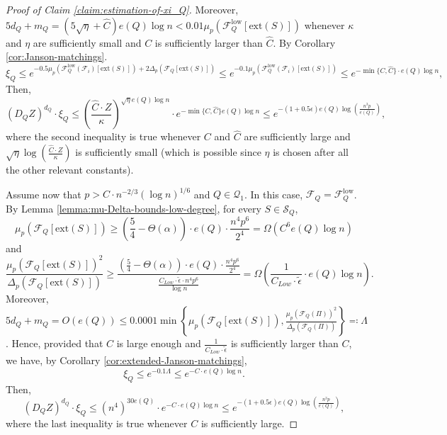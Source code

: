 \documentclass[11pt,a4paper,oneside,reqno]{amsart}
\newcommand{\cF}{\mathcal{F}}
\newcommand{\cQ}{\mathcal{Q}}
\newcommand{\cS}{\mathcal{S}}
\newcommand{\1}{\mathbbm{1}} %
\renewcommand{\le}{\leqslant}
\renewcommand{\ge}{\geqslant}
\newcommand{\cFQL}{\cF_Q^{\mathrm{low}}}
\newcommand{\ext}{\mathrm{ext}}
\begin{document}
\begin{proof}[Proof of Claim \ref{claim:estimation-of-xi_Q}]
    Moreover, $5d_Q + m_Q = (5 \sqrt{\eta} + \hat{C}) e(Q) \log n < 0.01 \mu_p\left(\cFQL\left[\ext(S)\right]\right)$ whenever $\kappa$ and $\eta$ are sufficiently small and $C$ is sufficiently larger than $\hat{C}$. By Corollary \ref{cor:Janson-matchings}.
    \[
        \xi_Q \le e^{-0.5 \mu_p\left(\cFQL(\cF_i)\left[\ext(S)\right]\right) + 2\Delta_p\left(\cF_Q\left[\ext(S)\right]\right)} \le e^{-0.1 \mu_p\left(\cFQL(\cF_i)\left[\ext(S)\right]\right)} \le e^{-\min\{C, \hat{C}\} \cdot e(Q) \log n},
    \]
    Then,
    \[
        (D_Q Z)^{d_Q} \cdot \xi_Q \le \left(\frac{\hat{C} \cdot Z}{\kappa}\right)^{\sqrt{\eta} e(Q) \log n} \cdot e^{-\min\{C, \hat{C}\} e(Q) \log n} \le e^{-(1+0.5\epsilon) e(Q) \log\left(\frac{n^3 p}{e(Q)}\right)},
    \]    
    where the second inequality is true whenever $C$ and $\hat{C}$ are sufficiently large and $\sqrt{\eta} \log\left(\frac{\hat{C} \cdot Z}{\kappa}\right)$ is sufficiently small (which is possible since $\eta$ is chosen after all the other relevant constants).

    Assume now that $p > C \cdot n^{-2/3} \left(\log n\right)^{1/6}$ and $Q \in \cQ_1$. In this case, $\cF_Q = \cFQL$. By Lemma \ref{lemma:mu-Delta-bounds-low-degree}, for every $S \in \cS_Q$,
    \[
        \mu_p\left(\cF_Q\left[\ext(S)\right]\right) \ge \left(\frac{5}{4} - \Theta(\alpha)\right) \cdot e(Q) \cdot \frac{n^4 p^6}{2^4} = \Omega\left(C^6 e(Q) \log n\right)
    \]
    and
    \[
        \frac{\mu_p\left(\cF_Q\left[\ext(S)\right]\right)^2}{\Delta_p\left(\cF_Q\left[\ext(S)\right]\right)} \ge \frac{\left(\frac{5}{4} - \Theta(\alpha)\right) \cdot e(Q) \cdot \frac{n^4 p^6}{2^4}}{\frac{C_{Low} \cdot \tilde{\epsilon} \cdot n^4 p^6}{\log n}} = \Omega\left(\frac{1}{C_{Low} \cdot \tilde{\epsilon}} \cdot e(Q) \log n\right).
    \]
    Moreover, $5d_Q + m_Q = O(e(Q)) \le 0.0001 \min\left\{\mu_p\left(\cF_Q\left[\ext(S)\right]\right), \frac{\mu_p\left(\cF_Q(\Pi)\right)^2}{\Delta_p\left(\cF_Q\left(\Pi\right)\right)}\right\} \eqqcolon \Lambda $. Hence, provided that $C$ is large enough and $\frac{1}{C_{Low} \cdot \tilde{\epsilon}}$ is sufficiently larger than $C$, we have, by Corollary \ref{cor:extended-Janson-matchings},
    \[
        \xi_Q \le e^{-0.1 \Lambda} \le e^{-C \cdot e(Q) \log n}.
    \]
    Then,
    \[
        (D_Q Z)^{d_Q} \cdot \xi_Q \le \left(n^4\right)^{30e(Q)} \cdot e^{-C \cdot e(Q) \log n} \le e^{-(1+0.5\epsilon) e(Q) \log\left(\frac{n^3 p}{e(Q)}\right)},
    \]
    where the last inequality is true whenever $C$ is sufficiently large.


\end{proof}
\end{document}
